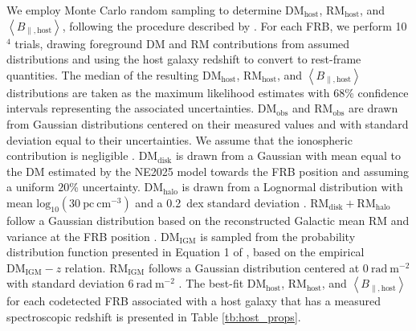 \documentclass[twocolumn, linenumbers]{aastex701}
\begin{document}
We employ Monte Carlo random sampling to determine $\mathrm{DM}_\mathrm{host}$, $\mathrm{RM}_\mathrm{host}$, and $\left<B_{\parallel,\mathrm{host}}\right>$, following the procedure described by \cite{2025ApJ...982..146P}. For each FRB, we perform 10$^4$ trials, drawing foreground DM and RM contributions from assumed distributions and using the host galaxy redshift to convert to rest-frame quantities. The median of the resulting $\mathrm{DM}_\mathrm{host}$, $\mathrm{RM}_\mathrm{host}$, and $\left<B_{\parallel,\mathrm{host}}\right>$ distributions are taken as the maximum likelihood estimates with 68\% confidence intervals representing the associated uncertainties. $\mathrm{DM}_\mathrm{obs}$ and $\mathrm{RM}_\mathrm{obs}$ are drawn from Gaussian distributions centered on their measured values and with standard deviation equal to their uncertainties. We assume that the ionospheric contribution is negligible \citep[typically $\mathrm{DM}_\mathrm{ion} \lesssim 10^{-5}~\mathrm{pc}~\mathrm{cm}^{-3}$ and $\mathrm{RM}_\mathrm{ion} \lesssim 1~\mathrm{rad}~\mathrm{m}^{-2}$;][]{2016ApJ...821...66L, 2019MNRAS.484.3646S}. $\mathrm{DM}_{\mathrm{disk}}$ is drawn from a Gaussian with mean equal to the DM estimated by the NE2025 model towards the FRB position \citep{2026arXiv260211838O} and assuming a uniform $20$\% uncertainty. $\mathrm{DM}_\mathrm{halo}$ is drawn from a Lognormal distribution with mean $\mathrm{log}_{10}(30~\mathrm{pc}~\mathrm{cm}^{-3})$ and a 0.2~dex standard deviation \citep{2015MNRAS.451.4277D,2020ApJ...888..105Y,2023ApJ...946...58C}. $\mathrm{RM}_{\mathrm{disk}} + \mathrm{RM}_{\mathrm{halo}}$ follow a Gaussian distribution based on the reconstructed Galactic mean RM and variance at the FRB position \citep{2022A&A...657A..43H}. $\mathrm{DM}_\mathrm{IGM}$ is sampled from the probability distribution function presented in Equation 1 of \cite{2024ApJ...965...57B}, based on the empirical $\mathrm{DM}_\mathrm{IGM} - z$ relation. $\mathrm{RM}_\mathrm{IGM}$ follows a Gaussian distribution centered at $0~\mathrm{rad}~\mathrm{m}^{-2}$ with standard deviation $6~\mathrm{rad}~\mathrm{m}^{-2}$ \citep{2010MNRAS.409L..99S}. The best-fit $\mathrm{DM}_\mathrm{host}$, $\mathrm{RM}_\mathrm{host}$, and $\left<B_{\parallel,\mathrm{host}}\right>$ for each codetected FRB associated with a host galaxy that has a measured spectroscopic redshift is presented in Table \ref{tb:host_props}.
\end{document}
